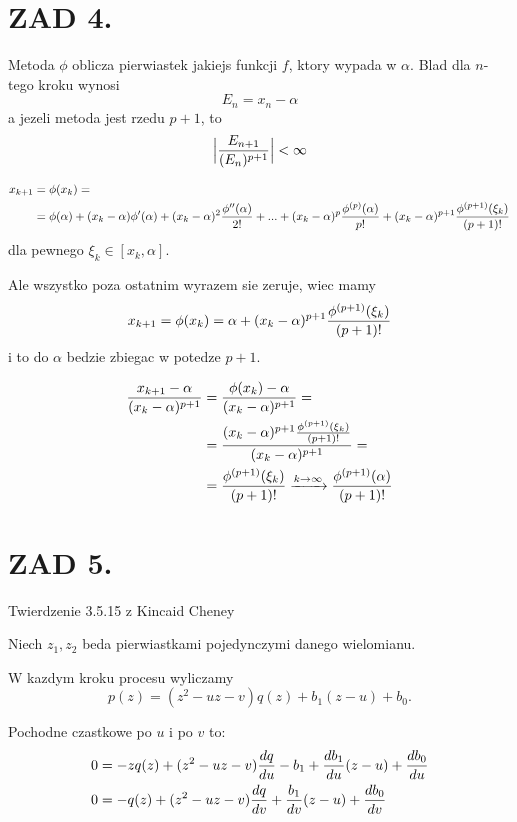 \documentclass{article}[16pt]
\begin{document}
    \section*{ZAD 4.}

    Metoda $\phi$ oblicza pierwiastek jakiejs funkcji $f$, ktory wypada w $\alpha$. Blad dla $n$-tego kroku wynosi
    $$E_n=x_n-\alpha$$
    a jezeli metoda jest rzedu $p+1$, to
    \begin{align*}
        \Big |{E_{n+1}\over (E_n)^{p+1}}\Big |< \infty
    \end{align*}

    \begin{align*}
        x_{k+1}&=\phi(x_k)=\\
        &=\phi(\alpha)+(x_k-\alpha)\phi'(\alpha)+(x_k-\alpha)^2{\phi''(\alpha)\over 2!}+...+(x_k-\alpha)^p{\phi^{(p)}(\alpha)\over p!}+(x_k-\alpha)^{p+1}{\phi^{(p+1)}(\xi_k)\over (p+1)!}
    \end{align*}
    dla pewnego $\xi_k\in[x_k,\alpha]$.
    \medskip

    Ale wszystko poza ostatnim wyrazem sie zeruje, wiec mamy
    $$x_{k+1}=\phi(x_k)=\alpha+(x_k-\alpha)^{p+1}{\phi^{(p+1)}(\xi_k)\over(p+1)!}$$
    i to do $\alpha$ bedzie zbiegac w potedze $p+1$.

    \begin{align*}
        {x_{k+1}-\alpha\over (x_k-\alpha)^{p+1}}&={\phi(x_k)-\alpha\over (x_k-\alpha)^{p+1}}=\\
        &={(x_k-\alpha)^{p+1}{\phi^{(p+1)}(\xi_k)\over(p+1)!}\over (x_k-\alpha)^{p+1}}=\\
        &={\phi^{(p+1)}(\xi_k)\over(p+1)!}\xrightarrow[]{k\to\infty}{\phi^{(p+1)}(\alpha)\over(p+1)!}
    \end{align*}

    
    \section*{ZAD 5.}

    Twierdzenie 3.5.15 z Kincaid Cheney
    \medskip

    Niech $z_1,z_2$ beda pierwiastkami pojedynczymi danego wielomianu.
    \medskip

    W kazdym kroku procesu wyliczamy
    $$p(z)=(z^2-uz-v)q(z)+b_1(z-u)+b_0.$$
    
    Pochodne czastkowe po $u$ i po $v$ to:
    \begin{align*}
        0&=-zq(z)+(z^2-uz-v){dq\over du}-b_1+{db_1\over du}(z-u)+{db_0\over du}\\
        0&=-q(z)+(z^2-uz-v){dq\over dv}+{b_1\over dv}(z-u)+{db_0\over dv}
    \end{align*}
\end{document}
